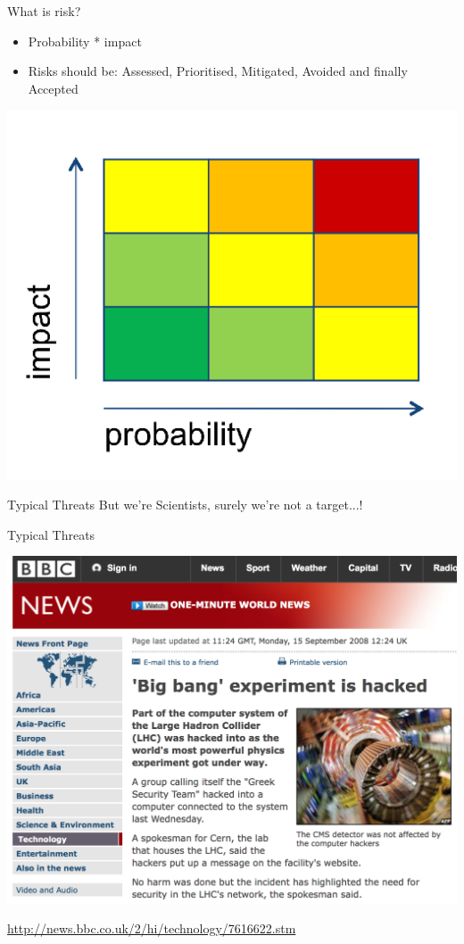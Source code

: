 \documentclass{beamer}
\begin{document}
\begin{frame}{What is risk?}
    \begin{itemize}
		\item Probability * impact
		\item Risks should be: Assessed, Prioritised, Mitigated, Avoided and finally Accepted
	\end{itemize}
    \begin{center} 
      \includegraphics[width=0.45\linewidth]{risk-matrix.png} 
    \end{center}
\end{frame}

\begin{frame}{Typical Threats}
\center 
But we're Scientists, surely we're not a target...! 
\end{frame}

\begin{frame}{Typical Threats}
  \begin{center}
		\includegraphics[width=0.65\linewidth]{bbc.png} \newline
        {\small \url{http://news.bbc.co.uk/2/hi/technology/7616622.stm} \par}
  \end{center}
\end{frame}
\end{document}
